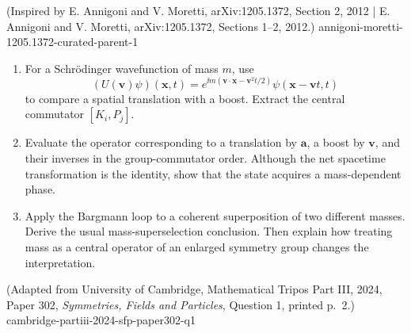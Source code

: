 \begin{enumerate}
  {(Inspired by E. Annigoni and V. Moretti, arXiv:1205.1372, Section 2, 2012 | E. Annigoni and V. Moretti, arXiv:1205.1372, Sections 1--2, 2012.)}
  {annigoni-moretti-1205.1372-curated-parent-1}
\begin{enumerate}
\item
For a Schr\"odinger wavefunction of mass \(m\), use
\[
 (U(\mathbf v)\psi)(\mathbf x,t)
 =e^{\ii m(\mathbf v\cdot\mathbf x-\mathbf v^2t/2)}
  \psi(\mathbf x-\mathbf v t,t)
\]
to compare a spatial translation with a boost.  Extract the central
commutator \([K_i,P_j]\).
\item
Evaluate the operator corresponding to a translation by \(\mathbf a\), a
boost by \(\mathbf v\), and their inverses in the group-commutator order.
Although the net spacetime transformation is the identity, show that the
state acquires a mass-dependent phase.
\item
Apply the Bargmann loop to a coherent superposition of two different
masses.  Derive the usual mass-superselection conclusion.  Then explain
how treating mass as a central operator of an enlarged symmetry group
changes the interpretation.
\end{enumerate}

  {(Adapted from University of Cambridge, Mathematical Tripos Part III, 2024, Paper 302, \emph{Symmetries, Fields and Particles}, Question 1, printed p.~2.)}
  {cambridge-partiii-2024-sfp-paper302-q1}


\end{enumerate}
